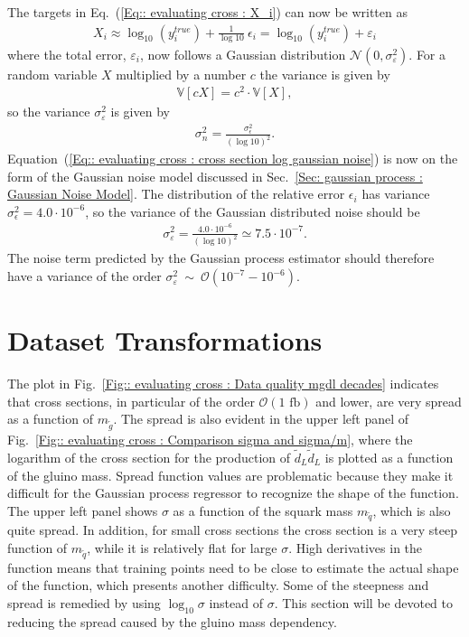 \documentclass[twoside,english]{uiofysmaster}
\begin{document}
{The targets in Eq.~(\ref{Eq:: evaluating cross : X_i}) can now be written as
\begin{align}\label{Eq:: evaluating cross : cross section log gaussian noise}
X_i \approx \log_{10}(y_i^{true}) + \frac{1}{\log 10} ~\epsilon_i = \log_{10}(y_i^{true}) + \varepsilon_i 
\end{align}
where the total error, $\varepsilon_i$, now follows a Gaussian distribution $\mathcal{N}(0, \sigma_{\varepsilon}^2)$. For a random variable $X$ multiplied by a number $c$ the variance is given by
\begin{align}
\mathbb{V}[c X] = c^2 \cdot \mathbb{V}[X],
\end{align}
so the variance $\sigma_{\varepsilon}^2$ is given by
\begin{align}
\sigma_n^2 = \frac{\sigma_{\epsilon}^2}{(\log 10)^2}.
\end{align}
Equation~(\ref{Eq:: evaluating cross : cross section log gaussian noise}) is now on the form of the Gaussian noise model discussed in Sec.~\ref{Sec: gaussian process : Gaussian Noise Model}. The distribution of the relative error $\epsilon_i$ has variance $\sigma_{\epsilon}^2 = 4.0 \cdot 10^{-6}$, so the variance of the Gaussian distributed noise should be
\begin{align*}
\sigma_{\varepsilon}^2 =  \frac{4.0 \cdot 10^{-6}}{(\log 10)^2} \simeq 7.5 \cdot 10^{-7}.
\end{align*}
The noise term predicted by the Gaussian process estimator should therefore have a variance of the order $\sigma_{\varepsilon}^2~\sim~\mathcal{O}(10^{-7}- 10^{-6})$.


\section{Dataset Transformations}

The plot in Fig.~\ref{Fig:: evaluating cross : Data quality mgdl decades} indicates that cross sections, in particular of the order $\mathcal{O}(1 \text{ fb})$ and lower, are very spread as a function of $m_{\widetilde{g}}$. The spread is also evident in the upper left panel of Fig.~\ref{Fig:: evaluating cross : Comparison sigma and sigma/m}, where the logarithm of the cross section for the production of $\widetilde{d}_L \widetilde{d}_L$ is plotted as a function of the gluino mass. Spread function values are problematic because they make it difficult for the Gaussian process regressor to recognize the shape of the function. The upper left panel shows $\sigma$ as a function of the squark mass $m_{\widetilde{q}}$, which is also quite spread. In addition, for small cross sections the cross section is a very steep function of $m_{\widetilde{q}}$, while it is relatively flat for large $\sigma$. High derivatives in the function means that training points need to be close to estimate the actual shape of the function, which presents another difficulty. Some of the steepness and spread is remedied by using $\log_{10} \sigma$ instead of $\sigma$. This section will be devoted to reducing the spread caused by the gluino mass dependency.

}
\end{document}
